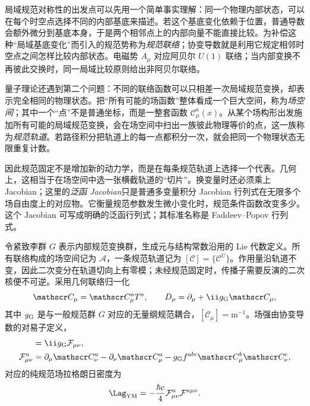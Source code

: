 局域规范对称性的出发点可以先用一个简单事实理解：同一个物理内部状态，可以在每个时空点选择不同的内部基底来描述。若这个基底变化依赖于位置，普通导数会额外微分到基底本身，于是两个相邻点上的内部向量不能直接比较。为补偿这种“局域基底变化”而引入的规范势称为\emph{规范联络}；协变导数就是利用它规定相邻时空点之间怎样比较内部状态。电磁势 $A_\mu$ 对应阿贝尔 $U(1)$ 联络；当内部变换不再彼此交换时，同一局域比较原则给出非阿贝尔联络。

量子理论还遇到第二个问题：不同的联络函数可以只相差一次局域规范变换，却表示完全相同的物理状态。把“所有可能的场函数”整体看成一个巨大空间，称为\emph{场空间}；其中一个“点”不是普通坐标，而是一整套函数 $\mathscr C_\mu^a(x)$。从某个场构形出发施加所有可能的局域规范变换，会在场空间中扫出一族彼此物理等价的点，这一族称为\emph{规范轨道}。若路径积分把轨道上的每一点都积分一次，就会把同一个物理状态无限重复计数。

因此规范固定不是增加新的动力学，而是在每条规范轨道上选择一个代表。几何上，这相当于在场空间中选一张横截轨道的“切片”。换变量时还必须乘上 Jacobian；这里的\emph{泛函 Jacobian}只是普通多变量积分 Jacobian 行列式在无限多个场自由度上的对应物。它衡量规范参数发生微小变化时，规范条件函数改变多少。这个 Jacobian 可写成明确的泛函行列式；其标准名称是 Faddeev--Popov 行列式。

令紧致李群 $G$ 表示内部规范变换群，生成元与结构常数沿用的 Lie 代数定义。所有联络构成的场空间记为 $\mathscr A$，一条规范轨道记为 $[\mathscr C]=\{\mathscr C^U\}$。作用量沿轨道不变，因此二次变分在轨道切向上有零模；未经规范固定时，传播子需要反演的二次核便不可逆。采用几何联络归一化
\begin{equation}
 \mathscr C_\mu=\mathscr C_\mu^aT^a,
 \qquad
 D_\mu=\partial_\mu+\ii g_{\rm G}\mathscr C_\mu,
 \label{eq:generic-gauge-cov-derivative-dp11}
\end{equation}
其中 $g_{\rm G}$ 是与一般规范群 $G$ 对应的无量纲规范耦合，$[\mathscr C_\mu]=\mathrm{m^{-1}}$。场强由协变导数的对易子定义，
\begin{align}
 [D_\mu,D_\nu]&=\ii g_{\rm G}\mathcal F_{\mu\nu},\\
 \mathcal F_{\mu\nu}^a
 &=\partial_\mu\mathscr C_\nu^a-\partial_\nu\mathscr C_\mu^a
 -g_{\rm G} f^{abc}\mathscr C_\mu^b\mathscr C_\nu^c,
 \label{eq:generic-field-strength-dp11}
\end{align}
对应的纯规范场拉格朗日密度为
\begin{equation}
 \Lag_{\rm YM}
 =-\frac{\hbar c}{4}\mathcal F_{\mu\nu}^a\mathcal F^{a\mu\nu}.
 \label{eq:generic-ym-lagrangian-dp11}
\end{equation}

